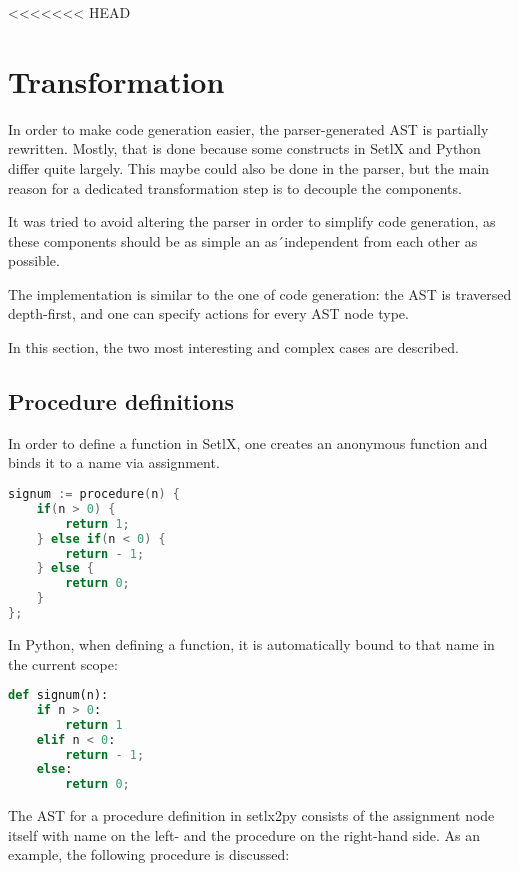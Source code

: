 <<<<<<< HEAD

\section{Transformation}

\label{sec:transformer}

In order to make code generation easier, the parser-generated AST is partially rewritten.  Mostly, that is done because some constructs in SetlX and Python differ quite largely. This maybe could also be done in the parser, but the main reason for a dedicated transformation step is to decouple the components. 

It was tried to avoid altering the parser in order to simplify code generation, as these components should be as simple an as´independent from each other as possible. 

The implementation is similar to the one of code generation: the AST is traversed depth-first, and one can specify actions for every AST node type. 

In this section, the two most interesting and complex cases are described.

%
\subsection{Procedure definitions}

In order to define a function in SetlX, one creates an anonymous function and binds it to a name via assignment.

\begin{lstlisting}[language=c]
signum := procedure(n) {
    if(n > 0) {
        return 1;
    } else if(n < 0) {
        return - 1;
    } else {
        return 0;
    }
};
\end{lstlisting}

In Python, when defining a function, it is automatically bound to that name in the current scope:

\begin{lstlisting}[language=python]
def signum(n):
    if n > 0:
        return 1
    elif n < 0:
        return - 1;
    else:
        return 0;
\end{lstlisting}

The AST for a procedure definition in setlx2py consists of the assignment node itself with name on the left- and the procedure on the right-hand side. As an example, the following procedure is discussed:

